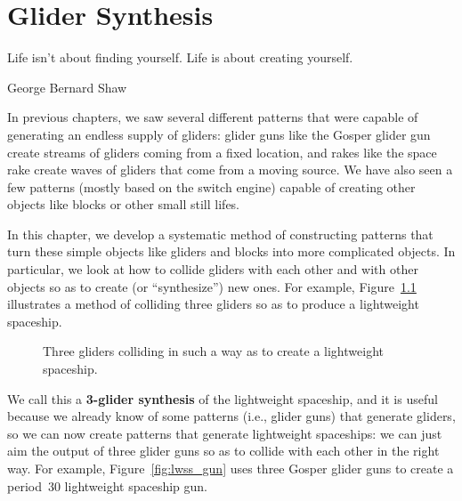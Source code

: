 
\renewcommand{\chapterfolder}{glider_synthesis/}
\chapter{Glider Synthesis}\label{chp:glider_synthesis}


\vspace*{-0.4in}
\epigraph{Life isn't about finding yourself. Life is about creating yourself.}{George Bernard Shaw}
\vspace*{0.4in}


\noindent In previous chapters, we saw several different patterns that were capable of generating an endless supply of gliders: glider guns like the Gosper glider gun create streams of gliders coming from a fixed location, and rakes like the space rake create waves of gliders that come from a moving source. We have also seen a few patterns (mostly based on the switch engine) capable of creating other objects like blocks or other small still lifes.

In this chapter, we develop a systematic method of constructing patterns that turn these simple objects like gliders and blocks into more complicated objects. In particular, we look at how to collide gliders with each other and with other objects so as to create (or ``synthesize'') new ones. For example, Figure~\ref{fig:lwss_3_gliders} illustrates a method of colliding three gliders so as to produce a lightweight spaceship.

\begin{figure}[!htb]
	\centering{}
	\caption{Three gliders colliding in such a way as to create a lightweight spaceship.}\label{fig:lwss_3_gliders}
\end{figure}

We call this a \textbf{3-glider synthesis} of the lightweight spaceship, and it is useful because we already know of some patterns (i.e., glider guns) that generate gliders, so we can now create patterns that generate lightweight spaceships: we can just aim the output of three glider guns so as to collide with each other in the right way. For example, Figure~\ref{fig:lwss_gun} uses three Gosper glider guns to create a period~30 lightweight spaceship gun.

